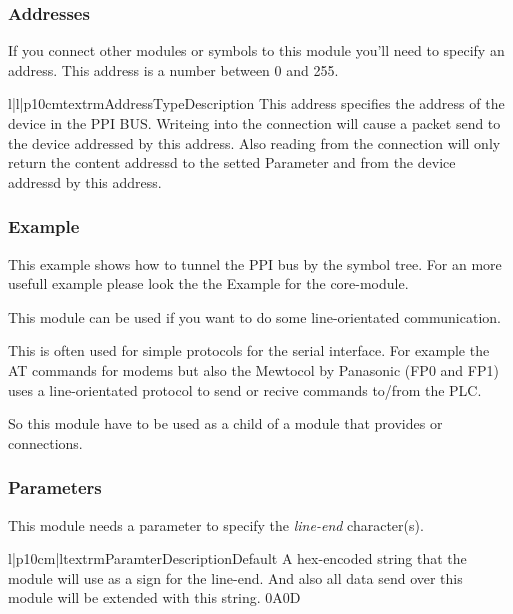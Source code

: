 \subsubsection{Addresses}
If you connect other modules or symbols to this module you'll need to specify
an address. This address is a number between 0 and 255. 
\begin{tableiii}{l|l|p{10cm}}{textrm}{Address}{Type}{Description}
        {This address specifies the address of the device in the PPI BUS. 
         Writeing into the connection will cause a packet send to the device
         addressed by this address. Also reading from the connection will only
         return the content addressd to the setted Parameter  and
         from the device addressd by this address.}
\end{tableiii}

\subsubsection{Example}
This example shows how to tunnel the PPI bus by the symbol tree. For an more
usefull example please look the the Example for the  core-module.




%
%
This module can be used if you want to do some line-orientated communication.

This is often used for simple protocols for the serial interface. For example
the AT commands for modems but also the Mewtocol by Panasonic (FP0 and FP1) 
uses a line-orientated protocol to send or recive commands to/from the PLC.  

So this module have to be used as a child of a module that provides
 or  connections.

\subsubsection{Parameters}
This module needs a parameter to specify the \emph{line-end} character(s).
\begin{tableiii}{l|p{10cm}|l}{textrm}{Paramter}{Description}{Default}
        {A hex-encoded string that the module will use as a sign for the 
         line-end. And also all data send over this module will be extended
         with this string.}
        {0A0D} 
\end{tableiii}

